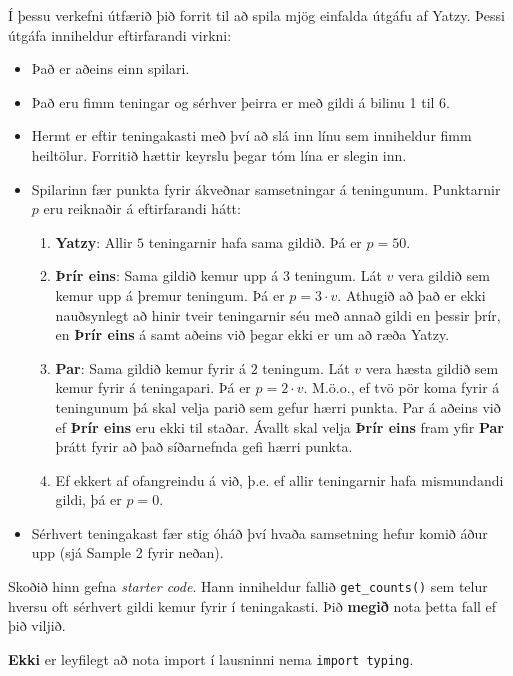 
Í þessu verkefni útfærið þið forrit til að spila mjög einfalda útgáfu af Yatzy.
Þessi útgáfa inniheldur eftirfarandi virkni:
\begin{itemize}
    \item Það er aðeins einn spilari.
    \item Það eru fimm teningar og sérhver þeirra er með gildi á bilinu 1 til 6.
    \item Hermt er eftir teningakasti með því að slá inn línu sem inniheldur fimm heiltölur.
    Forritið hættir keyrslu þegar tóm lína er slegin inn.
    \item Spilarinn fær punkta fyrir ákveðnar samsetningar á teningunum.
    Punktarnir $p$ eru reiknaðir á eftirfarandi hátt:
    \begin{enumerate}
        \item \textbf{Yatzy}: Allir $5$ teningarnir hafa sama gildið. Þá er $p = 50$.
        \item \textbf{Þrír eins}: Sama gildið kemur upp á $3$ teningum.
        Lát $v$ vera gildið sem kemur upp á þremur teningum. Þá er $p = 3 \cdot v$.
        Athugið að það er ekki nauðsynlegt að hinir tveir teningarnir séu með annað gildi en þessir þrír,
        en \textbf{Þrír eins} á samt aðeins við þegar ekki er um að ræða Yatzy.
        \item \textbf{Par}: Sama gildið kemur fyrir á $2$ teningum.
        Lát $v$ vera hæsta gildið sem kemur fyrir á teningapari. Þá er $p = 2 \cdot v$.
        M.ö.o., ef tvö pör koma fyrir á teningunum þá skal velja parið sem gefur hærri punkta.
        Par á aðeins við ef \textbf{Þrír eins} eru ekki til staðar.
        Ávallt skal velja \textbf{Þrír eins} fram yfir \textbf{Par} þrátt fyrir að það síðarnefnda gefi hærri punkta.
        \item Ef ekkert af ofangreindu á við, þ.e. ef allir teningarnir hafa mismundandi gildi, þá er $p=0$.
    \end{enumerate}
    \item Sérhvert teningakast fær stig óháð því hvaða samsetning hefur komið áður upp (sjá Sample 2 fyrir neðan).
\end{itemize}

Skoðið hinn gefna \textit{starter code}.
Hann inniheldur fallið \texttt{get\_counts()}
sem telur hversu oft sérhvert gildi kemur fyrir í teningakasti.
Þið \textbf{megið} nota þetta fall ef þið viljið.

\textbf{Ekki} er leyfilegt að nota import í lausninni nema \texttt{import typing}.


